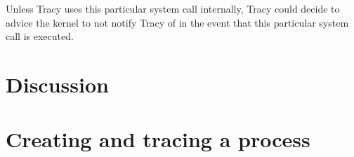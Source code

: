 \documentclass[a4paper, 10pt]{report}
\begin{document}
Unless Tracy uses this particular system call internally, Tracy could decide
to advice the kernel to not notify Tracy of in the event that this particular
system call is executed.





% 



\chapter{Discussion}




\pagebreak

\appendix
\addappheadtotoc

\chapter{Creating and tracing a process}
\label{appendix:createtrace}
\end{document}
